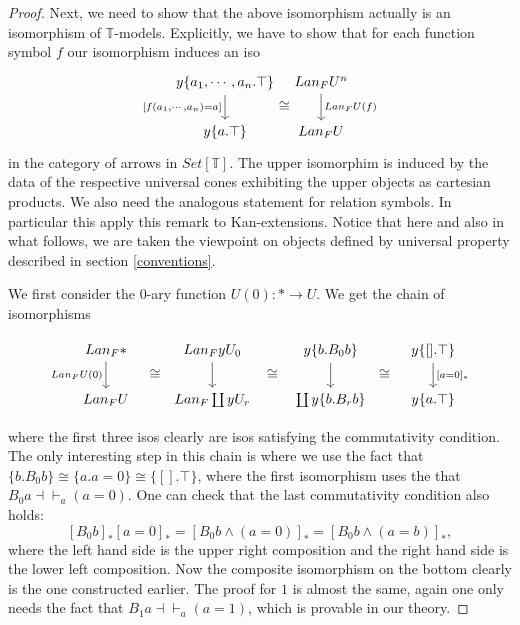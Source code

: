\documentclass[a4paper]{amsproc}
\theoremstyle{plain}
\theoremstyle{definition}
\theoremstyle{remark}
\numberwithin{equation}{section}
\begin{document}
\begin{proof}
Next, we need to show that the above isomorphism actually is an isomorphism of $\mathbb{T}$-models. Explicitly, we have to show that for each function symbol $f$ our isomorphism induces an iso
\[
\begin{tikzcd}[column sep=tiny]
    {y \{a_1,\cdots,a_n . \top \}} \arrow[d, "{[f(a_1,\cdots,a_n) = a]}"'] \arrow[r, "\cong"',phantom, shift right=7] & Lan_F U^n \arrow[d, "Lan_F U(f)"] \\
    y \{a . \top \}                                                                                           & Lan_F U                            
\end{tikzcd}
\]
in the category of arrows in $Set[\mathbb{T}]$. The upper isomorphim is induced by the data of the respective universal cones exhibiting the upper objects as cartesian products. We also need the analogous statement for relation symbols. In particular this apply this remark to Kan-extensions. Notice that here and also in what follows, we are taken the viewpoint on objects defined by universal property described in section \ref{conventions}. 

We first consider the 0-ary function $U(0): * \to U$. We get the chain of isomorphisms

\[
\begin{tikzcd}
Lan_F * \arrow[d, "Lan_F U(0)"'] \arrow[r, "\cong"',phantom, shift right=7] & Lan_F y U_0 \arrow[d] \arrow[r, "\cong"',phantom, shift right=7] & y \{b . B_0 b \} \arrow[d] \arrow[r, "\cong"',phantom, shift right=7] & {y \{[].\top\}} \arrow[d, "{[a=0]_*}"] \\
Lan_F U                                                             & Lan_F \coprod y U_r                                      & \coprod y \{ b . B_r b\}                                      & y\{a.\top\}                         
\end{tikzcd}
\]

where the first three isos clearly are isos satisfying the commutativity condition. The only interesting step in this chain is where we use the fact that $\{b . B_0 b\} \cong \{a . a = 0\} \cong \{[]. \top\}$, where the first isomorphism uses the that $B_0 a \dashv \vdash_a (a = 0)$. One can check that the last commutativity condition also holds:
\[
[B_0 b]_* [a=0]_* = [B_0 b \wedge (a = 0)]_* = [B_0 b \wedge (a=b)]_*,
\]
where the left hand side is the upper right composition and the right hand side is the lower left composition. Now the composite isomorphism on the bottom clearly is the one constructed earlier. The proof for $1$ is almost the same, again one only needs the fact that $B_1 a \dashv \vdash_a (a = 1)$, which is provable in our theory.


\end{proof}
\end{document}
